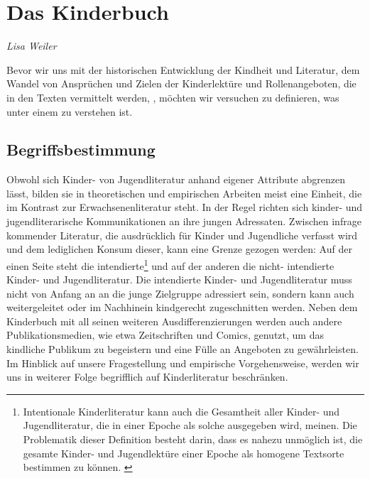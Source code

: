 
\section{Das Kinderbuch}   \emph{Lisa Weiler}   \smallskip


  \noindent Bevor wir uns mit der historischen Entwicklung der Kindheit und
  \ihrer Literatur, dem Wandel von Ansprüchen und Zielen der Kinderlektüre und
  \geschlechtsspezifischen Rollenangeboten, die in den Texten vermittelt werden,
  \auseinandersetzen, möchten wir versuchen zu definieren, was unter einem
  \Kinderbuch zu verstehen ist.
    
  \subsection{Begriffsbestimmung}     Obwohl sich Kinder- von Jugendliteratur
anhand eigener Attribute abgrenzen lässt, bilden sie in theoretischen und
empirischen Arbeiten meist eine Einheit, die im Kontrast zur
Erwachsenenliteratur steht. In der Regel richten sich kinder- und
jugendliterarische Kommunikationen an ihre jungen Adressaten. Zwischen infrage
kommender Literatur, die ausdrücklich für Kinder und Jugendliche verfasst wird
und dem lediglichen Konsum dieser, kann eine Grenze gezogen werden: Auf der
einen Seite steht die intendierte\footnote{Intentionale Kinderliteratur kann
auch die Gesamtheit aller Kinder- und Jugendliteratur, die in einer Epoche als
solche ausgegeben wird, meinen. Die Problematik dieser Definition besteht darin,
dass es nahezu unmöglich ist, die gesamte Kinder- und Jugendlektüre einer Epoche
als homogene Textsorte bestimmen zu können. \parencite[192\psq]{Ewers2008}}  und
auf der anderen die nicht- intendierte Kinder- und Jugendliteratur. Die
intendierte Kinder- und Jugendliteratur muss nicht von Anfang an an die junge
Zielgruppe adressiert sein, sondern kann auch weitergeleitet oder im Nachhinein
kindgerecht zugeschnitten werden. Neben dem Kinderbuch mit all seinen weiteren
Ausdifferenzierungen werden auch andere Publikationsmedien, wie etwa
Zeitschriften und Comics, genutzt, um das kindliche Publikum zu begeistern und
eine Fülle an Angeboten zu gewährleisten.  \parencite[5]{Ewers2011}  Im Hinblick
auf unsere Fragestellung und empirische Vorgehensweise, werden wir uns in
weiterer Folge begrifflich auf Kinderliteratur beschränken.

